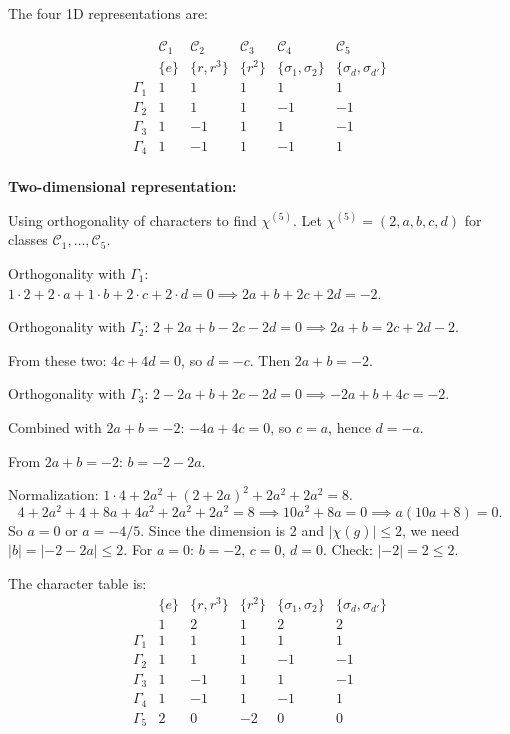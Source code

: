 \documentclass[12pt]{article}
\begin{document}
The four 1D representations are:

\[
\begin{array}{c|ccccc}
 & \mathcal{C}_1 & \mathcal{C}_2 & \mathcal{C}_3 & \mathcal{C}_4 & \mathcal{C}_5 \\
 & \{e\} & \{r,r^3\} & \{r^2\} & \{\sigma_1,\sigma_2\} & \{\sigma_d,\sigma_{d'}\} \\
\hline
\Gamma_1 & 1 & 1 & 1 & 1 & 1 \\
\Gamma_2 & 1 & 1 & 1 & -1 & -1 \\
\Gamma_3 & 1 & -1 & 1 & 1 & -1 \\
\Gamma_4 & 1 & -1 & 1 & -1 & 1 \\
\end{array}
\]

\medskip
\noindent\textbf{Two-dimensional representation:}

Using orthogonality of characters to find $\chi^{(5)}$. Let $\chi^{(5)} = (2, a, b, c, d)$ for classes $\mathcal{C}_1, \ldots, \mathcal{C}_5$.

Orthogonality with $\Gamma_1$: $1\cdot 2 + 2\cdot a + 1\cdot b + 2\cdot c + 2\cdot d = 0 \implies 2a + b + 2c + 2d = -2$.

Orthogonality with $\Gamma_2$: $2 + 2a + b - 2c - 2d = 0 \implies 2a + b = 2c + 2d - 2$.

From these two: $4c + 4d = 0$, so $d = -c$. Then $2a + b = -2$.

Orthogonality with $\Gamma_3$: $2 - 2a + b + 2c - 2d = 0 \implies -2a + b + 4c = -2$.

Combined with $2a + b = -2$: $-4a + 4c = 0$, so $c = a$, hence $d = -a$.

From $2a + b = -2$: $b = -2 - 2a$.

Normalization: $1\cdot 4 + 2a^2 + (2+2a)^2 + 2a^2 + 2a^2 = 8$.
\[
4 + 2a^2 + 4 + 8a + 4a^2 + 2a^2 + 2a^2 = 8 \implies 10a^2 + 8a = 0 \implies a(10a + 8) = 0.
\]
So $a = 0$ or $a = -4/5$. Since the dimension is 2 and $|\chi(g)| \leq 2$, we need $|b| = |{-2-2a}| \leq 2$. For $a = 0$: $b = -2$, $c = 0$, $d = 0$. Check: $|-2| = 2 \leq 2$. \checkmark

The character table is:
\[
\begin{array}{c|ccccc}
 & \{e\} & \{r,r^3\} & \{r^2\} & \{\sigma_1,\sigma_2\} & \{\sigma_d,\sigma_{d'}\} \\
 & 1 & 2 & 1 & 2 & 2 \\
\hline
\Gamma_1 & 1 & 1 & 1 & 1 & 1 \\
\Gamma_2 & 1 & 1 & 1 & -1 & -1 \\
\Gamma_3 & 1 & -1 & 1 & 1 & -1 \\
\Gamma_4 & 1 & -1 & 1 & -1 & 1 \\
\Gamma_5 & 2 & 0 & -2 & 0 & 0 \\
\end{array}
\]
\end{document}
